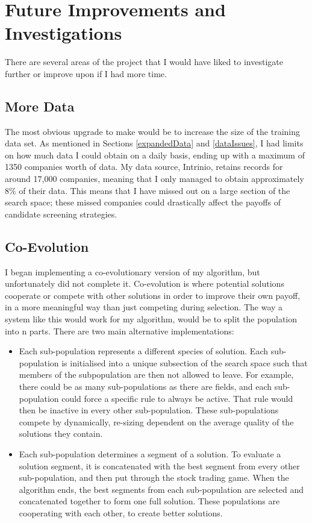 \section{Future Improvements and Investigations}
There are several areas of the project that I would have liked to investigate further or improve upon if I had more time.

\subsection{More Data}
The most obvious upgrade to make would be to increase the size of the training data set. As mentioned in Sections \ref{expandedData} and \ref{dataIssues}, I had limits on how much data I could obtain on a daily basis, ending up with a maximum of 1350 companies worth of data. My data source, Intrinio, retains records for around 17,000 companies, meaning that I only managed to obtain approximately 8\% of their data. This means that I have missed out on a large section of the search space; these missed companies could drastically affect the payoffs of candidate screening strategies.

\subsection{Co-Evolution}
I began implementing a co-evolutionary version of my algorithm, but unfortunately did not complete it. Co-evolution is where potential solutions cooperate or compete with other solutions in order to improve their own payoff, in a more meaningful way than just competing during selection. The way a system like this would work for my algorithm, would be to split the population into n parts. There are two main alternative implementations:
\begin{itemize}
    \item Each sub-population represents a different species of solution. Each sub-population is initialised into a unique subsection of the search space such that members of the subpopulation are then not allowed to leave. For example, there could be as many sub-populations as there are fields, and each sub-population could force a specific rule to always be active. That rule would then be inactive in every other sub-population. These sub-populations compete by dynamically, re-sizing dependent on the average quality of the solutions they contain.
    \item Each sub-population determines a segment of a solution. To evaluate a solution segment, it is concatenated with the best segment from every other sub-population, and then put through the stock trading game. When the algorithm ends, the best segments from each sub-population are selected and concatenated together to form one full solution. These populations are cooperating with each other, to create better solutions.
\end{itemize}

